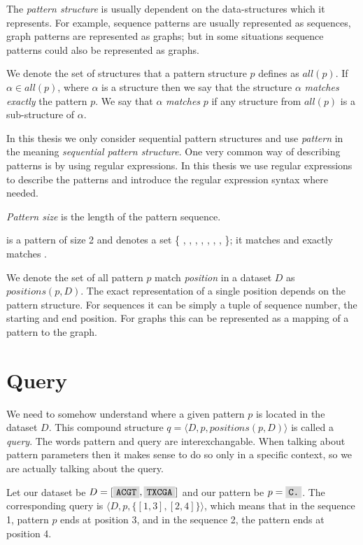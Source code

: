 The \emph{pattern structure} is usually dependent on the data-structures which it represents. For example, sequence patterns are usually represented as sequences, graph patterns are represented as graphs; but in some situations sequence patterns could also be represented as graphs.

We denote the set of structures that a pattern structure $p$ defines as $all(p)$. If $\alpha \in all(p)$, where $\alpha$ is a structure then we say that the structure $\alpha$ \emph{matches exactly} the pattern $p$. We say that $\alpha$ \emph{matches} $p$ if any structure from $all(p)$ is a sub-structure of $\alpha$.

In this thesis we only consider sequential pattern structures and use \emph{pattern} in the meaning \emph{sequential pattern structure}. One very common way of describing patterns is by using regular expressions\cite{KleeneRegularSets,RegularExpressions}. In this thesis we use regular expressions to describe the patterns and introduce the regular expression syntax where needed.

\emph{Pattern size} is the length of the pattern sequence.

\begin{exmp}
 is a pattern of size 2 and denotes a set 
\{ , , , , , , , \}; it matches  and exactly matches .	
\end{exmp}

We denote the set of all pattern $p$ match \emph{position} in a dataset $D$ as $positions(p, D)$. The exact representation of a single position depends on the pattern structure. For sequences it can be simply a tuple of sequence number, the starting and end position. For graphs this can be represented as a mapping of a pattern to the graph.

\section{Query}

We need to somehow understand where a given pattern $p$ is located in the dataset $D$. This compound structure $q = \langle D, p, positions(p, D) \rangle $ is called a \emph{query}. The words pattern and query are interexchangable. When talking about pattern parameters then it makes sense to do so only in a specific context, so we are actually talking about the query.

\begin{exmp}
Let our dataset be $D = [ \text{\R{ACGT}}, \text{\R{TXCGA}} ]$ and our pattern be $p = \text{\R{C.}}$. The corresponding query is $\langle D, p, \{ [1,3], [2,4]\} \rangle$, which means that in the sequence 1, pattern $p$ ends at position 3, and in the sequence 2, the pattern ends at position 4.
\end{exmp} 


